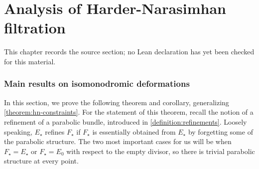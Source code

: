 \chapter{Analysis of Harder-Narasimhan filtration}
\label{geometric-local-systems-general-curves-isomonodromy-chapter-06}

\begin{remark}
\label{geometric-local-systems-general-curves-isomonodromy-chapter-06-source}
This chapter records the source section; no Lean declaration has yet been checked for this material.
\notready
\end{remark}

\label{section:hn-filtration}

\subsection{Main results on isomonodromic deformations} In this section, we prove the following theorem and corollary, generalizing \autoref{theorem:hn-constraints}.
For the statement of this theorem, recall the notion of a refinement of a
parabolic bundle, introduced in \autoref{definition:refinements}.
Loosely speaking, $E_\star$ refines $F_\star$ if $F_\star$ is essentially obtained
from $E_\star$ by forgetting some of the parabolic structure.
The two most
important cases for us will be when $F_\star= E_\star$
or $F_\star = E_0$ with respect to the empty divisor, so there is trivial
parabolic structure at every point.

